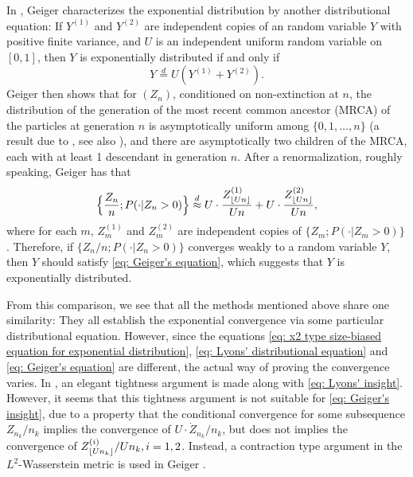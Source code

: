 \documentclass[12pt,a4paper]{amsart}
\DeclarePairedDelimiter\floor{\lfloor}{\rfloor}
\numberwithin{equation}{section}
\begin{document}
	In \cite{geiger2000new}, Geiger characterizes the exponential distribution by another distributional equation:
	If $Y^{(1)}$ and $Y^{(2)}$ are independent copies of an random variable $Y$ with positive finite variance, and $U$ is an independent uniform random variable on $[0,1]$, then $Y$ is exponentially distributed if and only if
\begin{equation}
\label{eq: Geiger's equation}
	Y	\overset{d} = U (Y^{(1)} + Y^{(2)}).
\end{equation}
	Geiger then shows that for $(Z_n)$, conditioned on non-extinction at $n$,
	the distribution of the generation of the most recent common ancestor (MRCA) of the particles at generation $n$ is asymptotically uniform among $\{0,1,\dots,n\}$ (a result due to \cite{Zubkov1975}, see also \cite{geiger1999elementary}), and there are asymptotically two children of
the MRCA, each with at least 1 descendant in generation $n$.
	After a renormalization, roughly speaking, Geiger has that
\begin{equation}
\label{eq: Geiger's insight}
	\Big\{\frac{Z_n}{n} ; P(  \cdot| Z_n > 0) \Big\}
		\overset{d}{\approx} U \cdot \frac{ Z^{(1)}_{  \floor{Un}  }}{Un} + U \cdot \frac{ Z^{(2)}_{ \floor{Un} }}{Un} ,
\end{equation}
	where for each $m$, $Z_m^{(1)}$ and $Z_m^{(2)}$ are independent copies of $\{Z_m; P(\cdot | Z_m > 0)\}$.
	Therefore, if $\{Z_n/n; P(\cdot| Z_n > 0)\}$ converges weakly to a random variable $Y$, then $Y$ should satisfy \eqref{eq: Geiger's equation}, which suggests that $Y$ is exponentially distributed.
	
	From this comparison, we see that all the methods mentioned above share one similarity: They all establish the exponential convergence via some particular distributional equation.
	However, since the equations \eqref{eq: x2 type size-biased equation for exponential distribution}, \eqref{eq: Lyons' distributional equation} and \eqref{eq: Geiger's equation} are different, the actual way of proving the convergence varies.
	In \cite{lyons1995conceptual}, an elegant tightness argument is made along with \eqref{eq: Lyons' insight}.
	However, it seems that this tightness argument is not suitable for \eqref{eq: Geiger's insight}, due to a property that the conditional convergence for some subsequence $Z_{n_k}/n_k$ implies the convergence of $U \cdot \dot Z_{n_k}/n_k$,
   	but does not implies the convergence of $Z^{(i)}_{ \floor{Un_k}}/Un_k, i=1, 2$.
	Instead, a contraction type argument in the $L^2$-Wasserstein metric is used in Geiger \cite{geiger2000new}.
	
\end{document}
